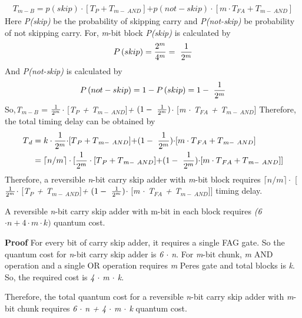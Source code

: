 \begin{align*}
{ T{}_{m-B} = p(skip) \cdot }[{ T{}_{P} +  T{}_{m-\ AND}}]{  + p(not-skip)\cdot }[{ m \cdot T{}_{FA} + T{}_{m-\ AND}}]
\end{align*}  	
\textnormal{
	Here {\it P(skip)} be the probability of skipping carry and {\it P(not-skip)} be probability of not skipping carry.
	For, {\it m}-bit block {\it P(skip)} is calculated by
	$${P\left(skip\right)}={{2^m}\over {4^m}}=\ {{1}\over {2^m}}$$ 
	And {\it P(not-skip)} is calculated by
	$${P\left(not-skip\right)}={1-P\left(skip\right)}=1-\ {{1}\over {2^m}}$$ 
	{\it }
	So,{\it  T${}_{m-B}$} = ${{1}\over {2^m}}${\it  $\cdot$ }[{\it T${}_{P}$ +  T${}_{m-\ AND}$}]{\it  + }$(1-\ {{1}\over {2^m}})${\it $\cdot$ }[{\it m $\cdot$ T${}_{FA}$ + T${}_{m-\ AND}$}]
	Therefore, the total timing delay can be obtained by
	\begin{align*}
	T{}_{d} &= k \cdot {{1}\over {2^m}}{  \cdot }[{ T{}_{P} +  T{}_{m-\ AND}}]{  + }(1-\ {{1}\over {2^m}}){  \cdot }[{ m \cdot T{}_{FA} + T{}_{m-\ AND}}]\\
	&=\lceil{n/m}\rceil \cdot [{{1}\over {2^m}}\cdot[{ T{}_{P} +  T{}_{m-\ AND}}]{  + }(1-\ {{1}\over {2^m}}){ \cdot }[{ m \cdot T{}_{FA} + T{}_{m-\ AND}}]]
	\end{align*}}
\textnormal{
	Therefore, a reversible {\it n}-bit carry skip adder with {\it m}-bit block requires $\lceil{n/m}\rceil\cdot$ [${{1}\over {2^m}}${\it  $\cdot$ }[{\it T${}_{P}$ +  T${}_{m-\ AND}$}]{\it  + }$(1-\ {{1}\over {2^m}})${\it $\cdot$ }[{\it m $\cdot$ T${}_{FA}$ + T${}_{m-\ AND}$}]] timing delay.}



\begin{property}\textnormal{
		A reversible {\it n}-bit carry skip adder with m-bit in each block requires {\it (6 $\cdot n + 4 \cdot m \cdot k)$} quantum cost.}
\end{property}

\noindent\textbf{Proof}\textnormal{
	For every bit of carry skip adder, it requires a single FAG gate. So the quantum cost for {\it n}-bit carry skip adder is {\it 6 $\cdot$ n}. For {\it m}-bit chunk, {\it m} AND operation and a single OR operation requires {\it m }Peres gate and total blocks is {\it k}. So, the required cost is {\it 4 $\cdot$ m $\cdot$ k}.}

\textnormal{
	Therefore, the total quantum cost for a reversible {\it n}-bit carry skip adder with {\it m}-bit chunk requires {\it 6 $\cdot$ n + 4 $\cdot$ m $\cdot$ k} quantum cost.}


